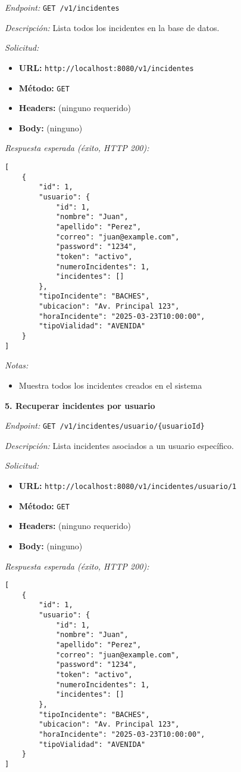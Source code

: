 \textit{Endpoint:} \texttt{GET /v1/incidentes}

\textit{Descripción:} Lista todos los incidentes en la base de datos.

\textit{Solicitud:}
\begin{itemize}
    \item \textbf{URL:} \texttt{http://localhost:8080/v1/incidentes}
    \item \textbf{Método:} \texttt{GET}
    \item \textbf{Headers:} (ninguno requerido)
    \item \textbf{Body:} (ninguno)
\end{itemize}

\textit{Respuesta esperada (éxito, HTTP 200):}
\begin{lstlisting}
[
    {
        "id": 1,
        "usuario": {
            "id": 1,
            "nombre": "Juan",
            "apellido": "Perez",
            "correo": "juan@example.com",
            "password": "1234",
            "token": "activo",
            "numeroIncidentes": 1,
            "incidentes": []
        },
        "tipoIncidente": "BACHES",
        "ubicacion": "Av. Principal 123",
        "horaIncidente": "2025-03-23T10:00:00",
        "tipoVialidad": "AVENIDA"
    }
]
\end{lstlisting}

\textit{Notas:}
\begin{itemize}
    \item Muestra todos los incidentes creados en el sistema
\end{itemize}

\textbf{5. Recuperar incidentes por usuario}

\textit{Endpoint:} \texttt{GET /v1/incidentes/usuario/\{usuarioId\}}

\textit{Descripción:} Lista incidentes asociados a un usuario específico.

\textit{Solicitud:}
\begin{itemize}
    \item \textbf{URL:} \texttt{http://localhost:8080/v1/incidentes/usuario/1}
    \item \textbf{Método:} \texttt{GET}
    \item \textbf{Headers:} (ninguno requerido)
    \item \textbf{Body:} (ninguno)
\end{itemize}

\textit{Respuesta esperada (éxito, HTTP 200):}
\begin{lstlisting}
[
    {
        "id": 1,
        "usuario": {
            "id": 1,
            "nombre": "Juan",
            "apellido": "Perez",
            "correo": "juan@example.com",
            "password": "1234",
            "token": "activo",
            "numeroIncidentes": 1,
            "incidentes": []
        },
        "tipoIncidente": "BACHES",
        "ubicacion": "Av. Principal 123",
        "horaIncidente": "2025-03-23T10:00:00",
        "tipoVialidad": "AVENIDA"
    }
]
\end{lstlisting}


